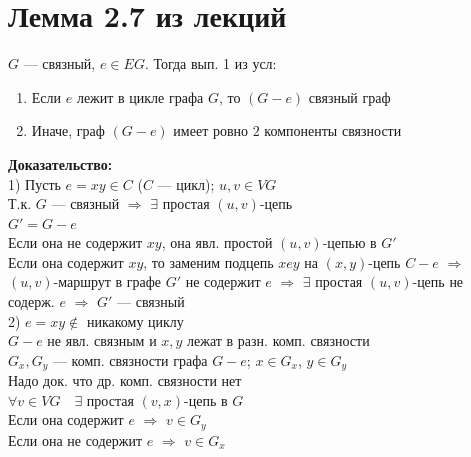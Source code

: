 \documentclass[12pt]{article}
\begin{document}
\section{Лемма 2.7 из лекций}
	$G$ — связный, $e \in EG$. Тогда вып. 1 из усл:
	\begin{enumerate}
		\item Если $e$ лежит в цикле графа $G$, то $(G - e)$ связный граф
		\item Иначе, граф $(G - e)$ имеет ровно $2$ компоненты связности
	\end{enumerate}
	\textbf{Доказательство:}\\
	1) Пусть $e = xy \in C$ ($C$ — цикл); $u,v \in VG$\\
	Т.к. $G$ — связный $\Rightarrow$ $\exists$ простая $(u,v)$-цепь\\
	$G' = G - e$\\
	Если она не содержит $xy$, она явл. простой $(u,v)$-цепью в $G'$\\
	Если она содержит $xy$, то заменим подцепь $xey$ на $(x,y)$-цепь $C-e$ $\Rightarrow$ $(u,v)$-маршрут в графе $G'$ не содержит $e$ $\Rightarrow$ $\exists$ простая $(u,v)$-цепь не содерж. $e$ $\Rightarrow$ $G'$ — связный\\
	2) $e = xy \notin$ никакому циклу\\
	$G-e$ не явл. связным и $x,y$ лежат в разн. комп. связности\\
	$G_x, G_y$ — комп. связности графа $G - e$; $x \in G_x$, $y \in G_y$\\
	Надо док. что др. комп. связности нет\\
	$\forall v \in VG \quad \exists$ простая $(v,x)$-цепь в $G$\\
	Если она содержит $e$ $\Rightarrow$ $v \in G_y$\\
	Если она не содержит $e$ $\Rightarrow$ $v \in G_x$\\
	\qedsymbol
\end{document}
